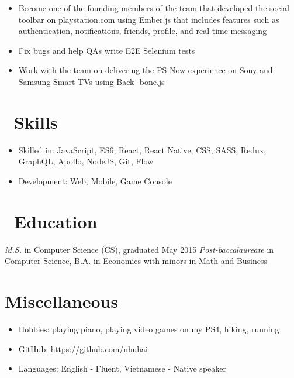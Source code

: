 \documentclass{resume}
\begin{document}
\begin{itemize}
  \item Become one of the founding members of the team that developed the social toolbar on playstation.com using Ember.js that includes features such as authentication, notifications, friends, profile, and real-time messaging
  \item Fix bugs and help QAs write E2E Selenium tests
\end{itemize}

\begin{itemize}
  \item Work with the team on delivering the PS Now experience on Sony and Samsung Smart TVs using Back- bone.js
\end{itemize}


\section{\faCogs\ Skills}
\begin{itemize}[parsep=0.5ex]
  \item Skilled in: JavaScript, ES6, React, React Native, CSS, SASS, Redux, GraphQL, Apollo, NodeJS, Git, Flow
  \item Development: Web, Mobile, Game Console
\end{itemize}

\section{\faGraduationCap\ Education}
\textit{M.S.} in Computer Science (CS), graduated May 2015
\textit{Post-baccalaureate} in Computer Science, B.A. in Economics with minors in Math and Business

\section{Miscellaneous}
\begin{itemize}[parsep=0.5ex]
  \item Hobbies: playing piano, playing video games on my PS4, hiking, running
  \item GitHub: https://github.com/nhuhai
  \item Languages: English - Fluent, Vietnamese - Native speaker
\end{itemize}

%
%
\end{document}

